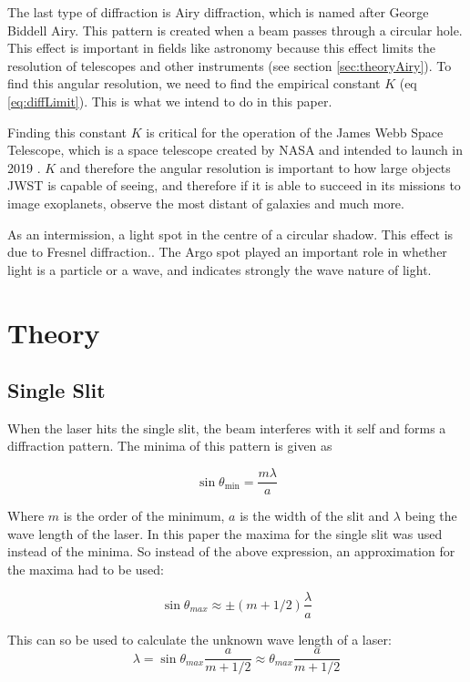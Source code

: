 \documentclass{emulateapj}
\begin{document}
The last type of diffraction is Airy diffraction, which is named after George Biddell Airy. This pattern is created when a beam passes through a circular hole. \cite{wiki:Airy} This effect is important in fields like astronomy because this effect limits the resolution of telescopes and other instruments (see section \ref{sec:theoryAiry}). To find this angular resolution, we need to find the empirical constant $K$ (eq \eqref{eq:diffLimit}). This is what we intend to do in this paper.

Finding this constant $K$ is critical for the operation of the James Webb Space Telescope, which is a space telescope created by NASA and intended to launch in 2019 \cite{Jwst} . $K$ and therefore the angular resolution is important to how large objects JWST is capable of seeing, and therefore if it is able to succeed in its missions to image exoplanets, observe the most distant of galaxies and much more.

As an intermission, a light spot in the centre of a circular shadow. This effect is due to Fresnel diffraction.\cite{wiki:Arago}. The Argo spot played an important role in whether light is a particle or a wave, and indicates strongly the wave nature of light.


\section{Theory}
\label{sec:theory}
\subsection{Single Slit}
When the laser hits the single slit, the beam interferes with it self and forms a diffraction pattern. The minima of this pattern is given as 

\begin{equation}
\sin \theta_{\min} = \frac{m\lambda}{a}
\end{equation}

Where $m$ is the order of the minimum, $a$ is the width of the slit and $\lambda$ being the wave length of the laser. In this paper the maxima for the single slit was used instead of the minima. So instead of the above expression, an approximation for the maxima had to be used:

\begin{equation}
\sin \theta_{max} \approx \pm (m+1/2)\frac{\lambda}{a}
\end{equation}\label{eq:slitMax}

This can so be used to calculate the unknown wave length of a laser:
\begin{equation}
\lambda = \sin \theta_{max}\frac{a}{m+1/2} \approx \theta_{max}\frac{a}{m+1/2}
\end{equation}
\end{document}
